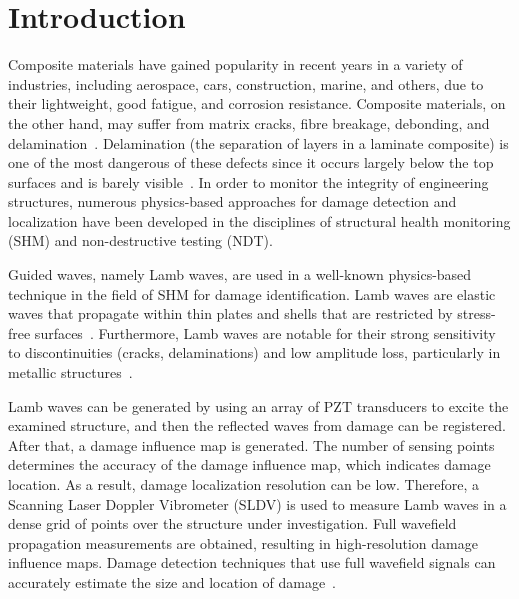 \documentclass[runningheads]{llncs}
\begin{document}
\section{Introduction}
Composite materials have gained popularity in recent years in a variety of industries, including aerospace, cars, construction, marine, and others, due to their lightweight, good fatigue, and corrosion resistance.
Composite materials, on the other hand, may suffer from matrix cracks, fibre breakage, debonding, and delamination~\cite{ip2004delamination}.
Delamination (the separation of layers in a laminate composite) is one of the most dangerous of these defects since it occurs largely below the top surfaces and is barely visible~\cite{Cai2012}.
%
In order to monitor the integrity of engineering structures, numerous physics-based approaches for damage detection and localization have been developed in the disciplines of structural health monitoring (SHM) and non-destructive testing (NDT).

Guided waves, namely Lamb waves, are used in a well-known physics-based technique in the field of SHM for damage identification.
Lamb waves are elastic waves that propagate within thin plates and shells that are restricted by stress-free surfaces~\cite{mitra2016guided}.
Furthermore, Lamb waves are notable for their strong sensitivity to discontinuities (cracks, delaminations) and low amplitude loss, particularly in metallic structures~\cite{Keulen2014}.

Lamb waves can be generated by using an array of PZT transducers to excite the examined structure, and then the reflected waves from damage can be registered.
After that, a damage influence map is generated.
The number of sensing points determines the accuracy of the damage influence map, which indicates damage location.
As a result, damage localization resolution can be low.
Therefore, a Scanning Laser Doppler Vibrometer (SLDV) is used to measure Lamb waves in a dense grid of points over the structure under investigation.
Full wavefield propagation measurements are obtained, resulting in high-resolution damage influence maps.
Damage detection techniques that use full wavefield signals can accurately estimate the size and location of damage~\cite{Girolamo2018a}.
\end{document}
